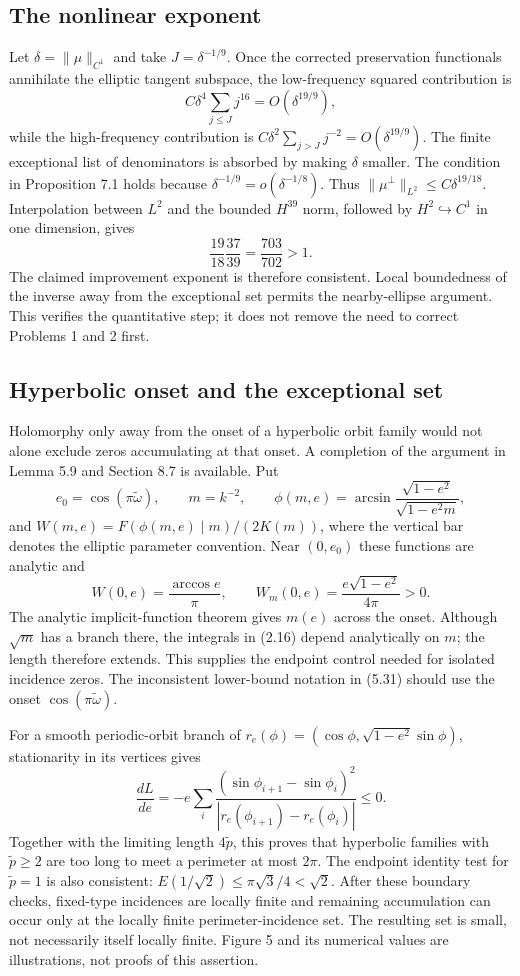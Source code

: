 \documentclass[10pt]{article}
\begin{document}
\subsection*{The nonlinear exponent}
Let \(\delta=\|\mu\|_{C^1}\) and take \(J=\delta^{-1/9}\). Once the corrected preservation functionals annihilate the elliptic tangent subspace, the low-frequency squared contribution is \[C\delta^4\sum_{j\leq J}j^{16}
 =O(\delta^{19/9}),\] while the high-frequency contribution is \(C\delta^2\sum_{j>J}j^{-2}=O(\delta^{19/9})\). The finite exceptional list of denominators is absorbed by making \(\delta\) smaller. The condition in Proposition 7.1 holds because \(\delta^{-1/9}=o(\delta^{-1/8})\). Thus \(\|\mu^\perp\|_{L^2}\leq C\delta^{19/18}\). Interpolation between \(L^2\) and the bounded \(H^{39}\) norm, followed by \(H^2\hookrightarrow C^1\) in one dimension, gives \[\frac{19}{18}\frac{37}{39}=\frac{703}{702}>1 .\] The claimed improvement exponent is therefore consistent. Local boundedness of the inverse away from the exceptional set permits the nearby-ellipse argument. This verifies the quantitative step; it does not remove the need to correct Problems 1 and 2 first.\par
\subsection*{Hyperbolic onset and the exceptional set}
Holomorphy only away from the onset of a hyperbolic orbit family would not alone exclude zeros accumulating at that onset. A completion of the argument in Lemma 5.9 and Section 8.7 is available. Put \[e_0=\cos(\pi\widetilde\omega),\qquad
 m=k^{-2},\qquad
 \phi(m,e)=\arcsin\frac{\sqrt{1-e^2}}{\sqrt{1-e^2m}},\] and \(W(m,e)=F(\phi(m,e)\mid m)/(2K(m))\), where the vertical bar denotes the elliptic parameter convention. Near \((0,e_0)\) these functions are analytic and \[W(0,e)=\frac{\arccos e}{\pi},\qquad
 W_m(0,e)=\frac{e\sqrt{1-e^2}}{4\pi}>0 .\] The analytic implicit-function theorem gives \(m(e)\) across the onset. Although \(\sqrt m\) has a branch there, the integrals in (2.16) depend analytically on \(m\); the length therefore extends. This supplies the endpoint control needed for isolated incidence zeros. The inconsistent lower-bound notation in (5.31) should use the onset \(\cos(\pi\widetilde\omega)\).\par
For a smooth periodic-orbit branch of \(r_e(\phi)=(\cos\phi,\sqrt{1-e^2}\sin\phi)\), stationarity in its vertices gives \[\frac{dL}{de}
 =-e\sum_i
 \frac{(\sin\phi_{i+1}-\sin\phi_i)^2}
 {|r_e(\phi_{i+1})-r_e(\phi_i)|}\leq0 .\] Together with the limiting length \(4\widetilde p\), this proves that hyperbolic families with \(\widetilde p\geq2\) are too long to meet a perimeter at most \(2\pi\). The endpoint identity test for \(\widetilde p=1\) is also consistent: \(E(1/\sqrt2)\leq\pi\sqrt3/4<\sqrt2\). After these boundary checks, fixed-type incidences are locally finite and remaining accumulation can occur only at the locally finite perimeter-incidence set. The resulting set is small, not necessarily itself locally finite. Figure 5 and its numerical values are illustrations, not proofs of this assertion.\par
\end{document}

